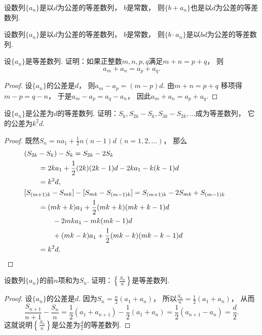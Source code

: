 \begin{property}
设数列\(\{a_n\}\)是以\(d\)为公差的等差数列，
\(b\)是常数，
则\(\{b + a_n\}\)也是以\(d\)为公差的等差数列.
\end{property}

\begin{property}
设数列\(\{a_n\}\)是以\(d\)为公差的等差数列，
\(b\)是常数，
则\(\{b \cdot a_n\}\)是以\(b d\)为公差的等差数列.
\end{property}

\begin{example}
设\(\{a_n\}\)是等差数列.
证明：如果正整数\(m,n,p,q\)满足\(m+n=p+q\)，
则\[
	a_m+a_n=a_p+a_q.
\]
\begin{proof}
设\(\{a_n\}\)的公差是\(d\)，
则\(a_m-a_p = (m-p)d\).
由\(m+n=p+q\)
移项得\(m-p=q-n\)，
于是\(a_m-a_p = a_q-a_n\)，
因此\(a_m+a_n=a_p+a_q\).
\end{proof}
\end{example}

\begin{example}
设\(\{a_n\}\)是公差为\(d\)的等差数列.
证明：\(S_k,S_{2k}-S_k,S_{3k}-S_{2k},\dotsc\)成为等差数列，
它的公差为\(k^2 d\).
\begin{proof}
既然\(S_n = n a_1 + \frac12 n(n-1) d\ (n=1,2,\dotsc)\)，
那么\begin{align*}
	&\hspace{-20pt}
	(S_{2k}-S_k) - S_k
	= S_{2k} - 2 S_k \\
	&= 2k a_1 + \frac12 (2k)(2k-1) d
	- 2 k a_1 - k(k-1) d \\
	&= k^2 d, \\
	&\hspace{-20pt}
	[S_{(m+1)k}-S_{mk}] - [S_{mk}-S_{(m-1)k}]
	= S_{(m+1)k} - 2 S_{mk} + S_{(m-1)k} \\
	&= (mk+k) a_1 + \frac12 (mk+k)(mk+k-1) d \\
	&\hspace{20pt}
	- 2 mk a_1 - mk (mk-1) d \\
	&\hspace{20pt}
	+ (mk-k) a_1 + \frac12 (mk-k)(mk-k-1) d \\
	&= k^2 d.
	\qedhere
\end{align*}
\end{proof}
\end{example}

\begin{example}
设数列\(\{a_n\}\)的前\(n\)项和为\(S_n\).
证明：\(\left\{\frac{S_n}{n}\right\}\)是等差数列.
\begin{proof}
设\(\{a_n\}\)的公差是\(d\).
因为\(S_n=\frac{n}2(a_1+a_n)\)，
所以\(\frac{S_n}{n}=\frac12(a_1+a_n)\)，
从而\[
	\frac{S_{n+1}}{n+1}-\frac{S_n}{n}
	= \frac12(a_1+a_{n+1})-\frac12(a_1+a_n)
	= \frac12(a_{n+1}-a_n)
	= \frac{d}2.
\]
这就说明\(\left\{\frac{S_n}{n}\right\}\)是公差为\(\frac{d}2\)的等差数列.
\end{proof}
\end{example}

